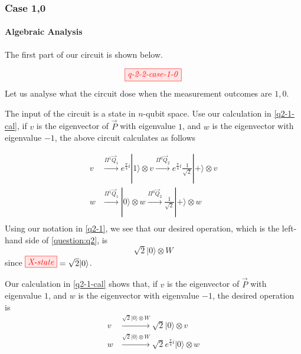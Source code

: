 \subsubsection{Case 1,0} \label{section:case-1-0}

\paragraph{Algebraic Analysis}

The first part of our circuit is shown below.

\begin{equation}\label{solution-effect}
\tikzfig{q-2-2-case-1-0}
\end{equation}
Let us analyse what the circuit dose when the measurement outcomes are $1, 0$.

The input of the circuit is a state in $n$-qubit space.
Use our calculation in \eqref{q2-1-cal}, if $v$ is the eigenvector of $\vec{P}$ with eigenvalue $1$, and $w$ is the eigenvector with eigenvalue $-1$, the above circuit calculates as follows

\begin{equation}\label{q2-2-10-cal}
	\begin{split}
	v 
	&\xrightarrow{\Pi^1 \vec{Q}_1} e^{\frac{\pi}{4}i} |1\rangle \otimes v 
	\xrightarrow{\Pi^0 \vec{Q}_2} e^{\frac{\pi}{4}i} \frac{1}{\sqrt{2}}|+\rangle \otimes v  \\
	w 
	&\xrightarrow{\Pi^1 \vec{Q}_1}  |0\rangle \otimes w 
	\xrightarrow{\Pi^0 \vec{Q}_2} \frac{1}{\sqrt{2}}|+\rangle \otimes w  \\
	\end{split}
\end{equation}
Using our notation in \eqref{q2-1}, we see that our desired operation, which is the left-hand side of \eqref{question:q2}, is 
$$
\sqrt{2} | 0 \rangle \otimes W 
$$
since $\tikzfig{X-state} = \sqrt{2} \ket{0}$.

Our calculation in \eqref{q2-1-cal} shows that, if $v$ is the eigenvector of $\vec{P}$ with eigenvalue $1$, and $w$ is the eigenvector with eigenvalue $-1$, the desired operation is
\begin{equation}
	\begin{split}
		v &\xrightarrow{\sqrt{2} | 0 \rangle \otimes W} \sqrt{2} |0\rangle \otimes v \\
		w &\xrightarrow{\sqrt{2} | 0 \rangle \otimes W} \sqrt{2} e^{\frac{\pi}{4}i} |0\rangle \otimes w
	\end{split}
\end{equation}

